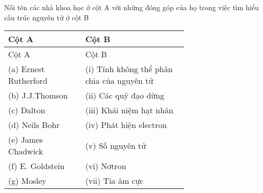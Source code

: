 \begin{bt}%
	Nối tên các nhà khoa học ở cột A với những đóng góp của họ trong việc tìm hiểu cấu trúc nguyên tử ở cột B
	\par\noindent
	\begin{longtable}{|p{0.3\linewidth}|p{0.4\linewidth}|}
		\hline\rowcolor{\mycolor!10}
		Cột A & Cột B \\
		\hline
		\endfirsthead
		\hline\rowcolor{\mycolor!10}
		Cột A & Cột B \\
		\hline
		\endhead
		\hline
		\endfoot
		\hline
		\endlastfoot
		(a) Ernest Rutherford & (i) Tính không thể phân chia của nguyên tử\\
		(b) J.J.Thomson &(ii) Các quỹ đạo dừng\\
		(c) Dalton &(iii) Khái niệm hạt nhân\\
		(d) Neils Bohr &(iv) Phát hiện electron\\
		(e) James Chadwick &(v) Số nguyên tử\\
		(f) E. Goldstein &(vi) Nơtron\\
		(g) Mosley &(vii) Tia âm cực\\
		\hline
	\end{longtable}
\end{bt}
